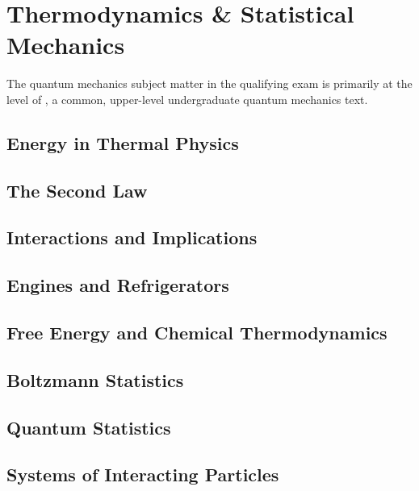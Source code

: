 \newpage
\chapter{Thermodynamics \& Statistical Mechanics}
\label{sec:thermo}
The quantum mechanics subject matter in the qualifying exam is primarily at the level of \cite{schroederIntroductionThermalPhysics2000}, a common, upper-level undergraduate quantum mechanics text.


\section{Energy in Thermal Physics}
\section{The Second Law}
\section{Interactions and Implications}
\section{Engines and Refrigerators}
\section{Free Energy and Chemical Thermodynamics}
\section{Boltzmann Statistics}
\section{Quantum Statistics}
\section{Systems of Interacting Particles}












